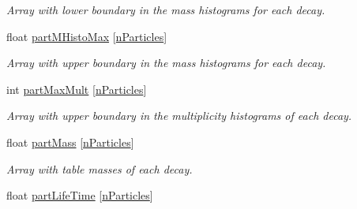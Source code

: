 \begin{DoxyCompactItemize}
\begin{DoxyCompactList}\small\item\em Array with lower boundary in the mass histograms for each decay. \end{DoxyCompactList}\item 
float \hyperlink{classKFPartEfficiencies_ad104f05f0cb7cf8cc6dd10e009a6bd65}{part\+M\+Histo\+Max} \mbox{[}\hyperlink{classKFPartEfficiencies_a229165eeecbc664b7723d3ce588783e8}{n\+Particles}\mbox{]}\hypertarget{classKFPartEfficiencies_ad104f05f0cb7cf8cc6dd10e009a6bd65}{}\label{classKFPartEfficiencies_ad104f05f0cb7cf8cc6dd10e009a6bd65}

\begin{DoxyCompactList}\small\item\em Array with upper boundary in the mass histograms for each decay. \end{DoxyCompactList}\item 
int \hyperlink{classKFPartEfficiencies_a55765f5f102fffd399b162ed2ccad4d2}{part\+Max\+Mult} \mbox{[}\hyperlink{classKFPartEfficiencies_a229165eeecbc664b7723d3ce588783e8}{n\+Particles}\mbox{]}\hypertarget{classKFPartEfficiencies_a55765f5f102fffd399b162ed2ccad4d2}{}\label{classKFPartEfficiencies_a55765f5f102fffd399b162ed2ccad4d2}

\begin{DoxyCompactList}\small\item\em Array with upper boundary in the multiplicity histograms of each decay. \end{DoxyCompactList}\item 
float \hyperlink{classKFPartEfficiencies_a652a5223c14c9d8e4a32c5203ce32d34}{part\+Mass} \mbox{[}\hyperlink{classKFPartEfficiencies_a229165eeecbc664b7723d3ce588783e8}{n\+Particles}\mbox{]}\hypertarget{classKFPartEfficiencies_a652a5223c14c9d8e4a32c5203ce32d34}{}\label{classKFPartEfficiencies_a652a5223c14c9d8e4a32c5203ce32d34}

\begin{DoxyCompactList}\small\item\em Array with table masses of each decay. \end{DoxyCompactList}\item 
float \hyperlink{classKFPartEfficiencies_a8d3d967e6832115dc711c33d6207c579}{part\+Life\+Time} \mbox{[}\hyperlink{classKFPartEfficiencies_a229165eeecbc664b7723d3ce588783e8}{n\+Particles}\mbox{]}\hypertarget{classKFPartEfficiencies_a8d3d967e6832115dc711c33d6207c579}{}\label{classKFPartEfficiencies_a8d3d967e6832115dc711c33d6207c579}


\end{DoxyCompactItemize}

